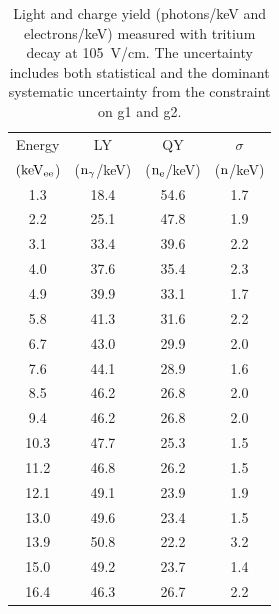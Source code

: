 \begin{table}[h!]
\centering
\begin{tabular}{|c|c|c|c|} \hline
Energy 	& 		LY	& 	QY	& $\sigma$ \\ 
$\rm (keV_{ee}$) & ($\rm n_\gamma$/keV)   & ($\rm n_e$/keV) & ($\rm n$/keV) \\ \hline
1.3 	 & 18.4 	 & 54.6 	 & 1.7 	 \\ \hline 
2.2 	 & 25.1 	 & 47.8 	 & 1.9 	 \\ \hline 
3.1 	 & 33.4 	 & 39.6 	 & 2.2 	 \\ \hline 
4.0 	 & 37.6 	 & 35.4 	 & 2.3 	 \\ \hline 
4.9 	 & 39.9 	 & 33.1 	 & 1.7 	 \\ \hline 
5.8 	 & 41.3 	 & 31.6 	 & 2.2 	 \\ \hline 
6.7 	 & 43.0 	 & 29.9 	 & 2.0 	 \\ \hline 
7.6 	 & 44.1 	 & 28.9 	 & 1.6 	 \\ \hline 
8.5 	 & 46.2 	 & 26.8 	 & 2.0 	 \\ \hline 
9.4 	 & 46.2 	 & 26.8 	 & 2.0 	 \\ \hline 
10.3 	 & 47.7 	 & 25.3 	 & 1.5 	 \\ \hline 
11.2 	 & 46.8 	 & 26.2 	 & 1.5 	 \\ \hline 
12.1 	 & 49.1 	 & 23.9 	 & 1.9 	 \\ \hline 
13.0 	 & 49.6 	 & 23.4 	 & 1.5 	 \\ \hline 
13.9 	 & 50.8 	 & 22.2 	 & 3.2 	 \\ \hline 
15.0 	 & 49.2 	 & 23.7 	 & 1.4 	 \\ \hline 
16.4 	 & 46.3 	 & 26.7 	 & 2.2 	 \\ \hline 
\end{tabular}
\caption{Light and charge yield (photons/keV and electrons/keV) measured with tritium decay at 105~V/cm. The uncertainty includes both statistical and the dominant systematic uncertainty from the constraint on g1 and g2. }
\label{table:Yields_100}
\end{table}


